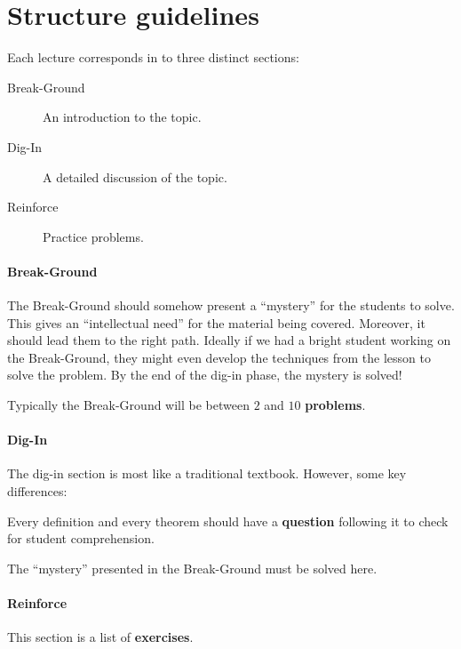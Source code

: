 \documentclass{ximera}
\begin{document}
\section{Structure guidelines}

Each lecture corresponds in \mooculus to three distinct sections:
\begin{description}
\item[Break-Ground] An introduction to the topic.
\item[Dig-In] A detailed discussion of the topic.
\item[Reinforce] Practice problems.
\end{description}

\paragraph{Break-Ground}

The Break-Ground should somehow present a ``mystery'' for the students
to solve.  This gives an ``intellectual need'' for the material being
covered. Moreover, it should lead them to the right path. Ideally if
we had a bright student working on the Break-Ground, they might even develop
the techniques from the lesson to solve the problem.  By the end of
the dig-in phase, the mystery is solved!

Typically the Break-Ground will be between $2$ and $10$ \textbf{problems}.



\paragraph{Dig-In}


The dig-in section is most like a traditional textbook. However, some
key differences:


Every definition and every theorem should have a \textbf{question}
following it to check for student comprehension.


The ``mystery'' presented in the Break-Ground must be solved here. 



\paragraph{Reinforce}

This section is a list of \textbf{exercises}. 
\end{document}
